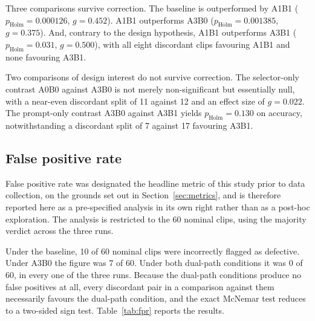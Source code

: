 Three comparisons survive correction. The baseline is outperformed by
A1B1 ($p_{\text{Holm}} = 0.000126$, $g = 0.452$). A1B1 outperforms A3B0
($p_{\text{Holm}} = 0.001385$, $g = 0.375$). And, contrary to the design
hypothesis, A1B1 outperforms A3B1 ($p_{\text{Holm}} = 0.031$,
$g = 0.500$), with all eight discordant clips favouring A1B1 and none
favouring A3B1.

Two comparisons of design interest do not survive correction. The
selector-only contrast A0B0 against A3B0 is not merely non-significant but
essentially null, with a near-even discordant split of 11 against 12 and
an effect size of $g = 0.022$. The prompt-only contrast A3B0 against A3B1
yields $p_{\text{Holm}} = 0.130$ on accuracy, notwithstanding a discordant
split of 7 against 17 favouring A3B1.

\subsection{False positive rate}
\label{sec:fprtest}

False positive rate was designated the headline metric of this study prior
to data collection, on the grounds set out in Section~\ref{sec:metrics},
and is therefore reported here as a pre-specified analysis in its own
right rather than as a post-hoc exploration. The analysis is restricted to
the 60 nominal clips, using the majority verdict across the three runs.

Under the baseline, 10 of 60 nominal clips were incorrectly flagged as
defective. Under A3B0 the figure was 7 of 60. Under both dual-path
conditions it was 0 of 60, in every one of the three runs. Because the
dual-path conditions produce no false positives at all, every discordant
pair in a comparison against them necessarily favours the dual-path
condition, and the exact McNemar test reduces to a two-sided sign test.
Table~\ref{tab:fpr} reports the results.

